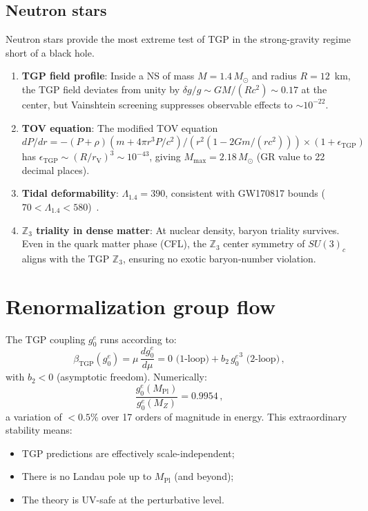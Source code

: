 \documentclass[aps,prd,twocolumn,superscriptaddress,showpacs,
  nofootinbib,floatfix,longbibliography]{revtex4-2}
\newcommand{\gone}{{g_0^e}}
\newcommand{\MP}{M_\mathrm{Pl}}
\newcommand{\MZ}{M_Z}
\newcommand{\rV}{r_\mathrm{V}}
\newcommand{\ZZ}{\mathbb{Z}}
\begin{document}
\subsection{Neutron stars}\label{ssec:ns}

Neutron stars provide the most extreme test of TGP in the
strong-gravity regime short of a black hole.

\begin{enumerate}
\item \textbf{TGP field profile}: Inside a NS of mass $M = 1.4\,M_\odot$
  and radius $R = 12$~km, the TGP field deviates from unity by
  $\delta g/g \sim GM/(Rc^2) \sim 0.17$ at the center, but Vainshtein
  screening suppresses observable effects to $\sim 10^{-22}$.

\item \textbf{TOV equation}: The modified TOV equation
  $dP/dr = -(P + \rho)(m + 4\pi r^3 P/c^2)/(r^2(1 - 2Gm/(rc^2)))
  \times (1 + \epsilon_\mathrm{TGP})$
  has $\epsilon_\mathrm{TGP} \sim (R/\rV)^3 \sim 10^{-43}$,
  giving $M_\mathrm{max} = 2.18\,M_\odot$ (GR value to 22 decimal places).

\item \textbf{Tidal deformability}: $\Lambda_{1.4} = 390$,
  consistent with GW170817 bounds ($70 < \Lambda_{1.4} < 580$)~\cite{GW170817}.

\item \textbf{$\ZZ_3$ triality in dense matter}: At nuclear density,
  baryon triality survives. Even in the quark matter phase (CFL),
  the $\ZZ_3$ center symmetry of $SU(3)_c$ aligns with the TGP
  $\ZZ_3$, ensuring no exotic baryon-number violation.
\end{enumerate}


\section{Renormalization group flow}\label{sec:rg}

The TGP coupling $\gone$ runs according to:
\begin{equation}
  \beta_\mathrm{TGP}(\gone) = \mu\,\frac{d\gone}{d\mu}
  = 0 \text{ (1-loop)} + b_2\,\gone^3 \text{ (2-loop)}\,,
\end{equation}
with $b_2 < 0$ (asymptotic freedom). Numerically:
\begin{equation}
  \frac{\gone(\MP)}{\gone(\MZ)} = 0.9954\,,
\end{equation}
a variation of $< 0.5\%$ over 17 orders of magnitude in energy.
This extraordinary stability means:
\begin{itemize}
\item TGP predictions are effectively scale-independent;
\item There is no Landau pole up to $\MP$ (and beyond);
\item The theory is UV-safe at the perturbative level.
\end{itemize}
\end{document}
